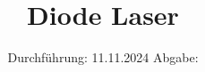 

\subject{V60}
\title{Diode Laser}
\date{%
  Durchführung: 11.11.2024
  \hspace{3em}
  Abgabe:
}



\maketitle
\thispagestyle{empty}
\tableofcontents
\newpage







\printbibliography{}






